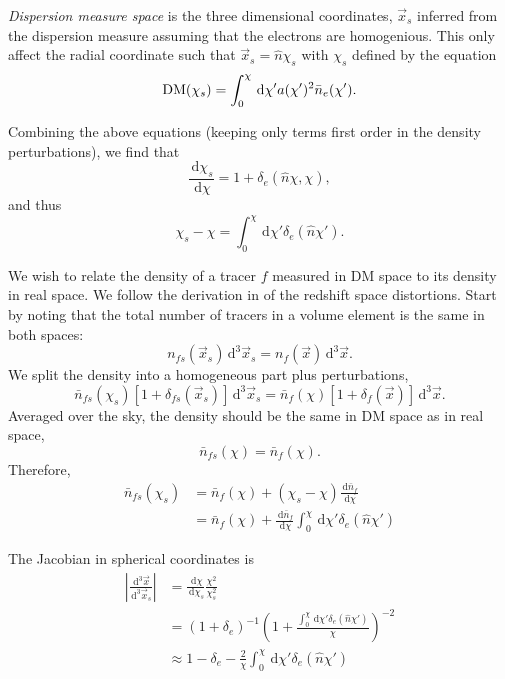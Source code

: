 \documentclass[twocolumn,prl,nofootinbib]{revtex4-1}
\newcommand{\ud}{\,\mathrm{d}}
\begin{document}
\emph{Dispersion measure space} is the three dimensional coordinates,
$\vec x_s$ inferred from the dispersion measure assuming that the electrons are
homogenious. This only affect the radial coordinate such that $\vec x_s = \hat
n \chi_s$ with $\chi_s$ defined by the equation
\begin{equation}
    {\rm DM}(\chi_s) = \int_0^\chi \ud\chi' a(\chi')^2 \bar{n}_e(\chi').
\end{equation}

Combining the above equations (keeping only terms first order in the density
perturbations), we find that
\begin{equation}
\frac{\ud \chi_s}{\ud \chi} = 1 + \delta_e(\hat n \chi, \chi),
\end{equation}
and thus
\begin{equation}
\chi_s - \chi = \int_0^\chi \ud \chi' \delta_e(\hat n \chi').
\end{equation}

We wish to relate the density of a tracer $f$ measured in DM space to its
density in real space. We follow the derivation in \citet{Kaiser} of the
redshift space distortions. Start by noting that the total number of tracers
in a volume element is the same in both spaces:
\begin{equation}
\label{e:density}
n_{fs}(\vec x_s) \ud^3\vec x_s = n_{f}(\vec x) \ud^3\vec x.
\end{equation}
We split the density into a homogeneous part plus perturbations,
\begin{equation}
    \bar{n}_{fs}(\chi_s)\left[ 1 + \delta_{fs}(\vec x_s)\right] \ud^3\vec x_s
    = \bar{n}_{f}(\chi)\left[ 1 + \delta_f(\vec x)\right] \ud^3\vec x.
\end{equation}
Averaged over the sky, the density should be the same in DM 
space as in real space,
\begin{equation}
\bar{n}_{fs}(\chi) = \bar{n}_f(\chi).
\end{equation}
Therefore,
\begin{align}
\bar{n}_{fs}(\chi_s) 
    &= \bar{n}_{f}(\chi) + (\chi_s - \chi)\frac{\ud \bar{n}_f}{\ud \chi}\\
    &= \bar{n}_{f}(\chi)
       + \frac{\ud \bar{n}_f}{\ud \chi}\int_0^\chi \ud \chi' \delta_e(\hat n \chi')
       \label{e:nfs}
\end{align}

The Jacobian in spherical coordinates is
\begin{align}
\left| \frac{\ud^3\vec x}{\ud^3\vec x_s} \right|
    &= \frac{\ud \chi}{\ud \chi_s}\frac{\chi^2}{\chi_s^2}\\
    &= (1 + \delta_e)^{-1}
       \left(1 + \frac{\int_0^\chi \ud \chi' \delta_e(\hat n \chi')}
                      {\chi}\right)^{-2}\\
    &\approx 1 - \delta_e
        - \frac{2}{\chi}\int_0^\chi \ud \chi' \delta_e(\hat n \chi')
        \label{e:jac}
\end{align}
\end{document}
